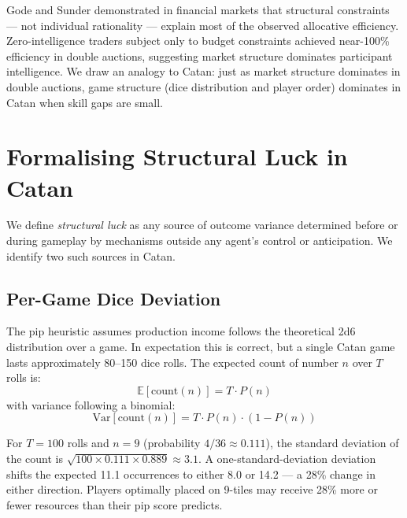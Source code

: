\documentclass[12pt,a4paper]{article}
\begin{document}
{Gode and Sunder \cite{gode1993allocative} demonstrated in financial
markets that structural constraints --- not individual rationality ---
explain most of the observed allocative efficiency. Zero-intelligence
traders subject only to budget constraints achieved near-100\% efficiency
in double auctions, suggesting market structure dominates participant
intelligence. We draw an analogy to Catan: just as market structure
dominates in double auctions, game structure (dice distribution and
player order) dominates in Catan when skill gaps are small.

\section{Formalising Structural Luck in Catan}

We define \textit{structural luck} as any source of outcome variance
determined before or during gameplay by mechanisms outside any agent's
control or anticipation. We identify two such sources in Catan.

\subsection{Per-Game Dice Deviation}

The pip heuristic assumes production income follows the theoretical 2d6
distribution over a game. In expectation this is correct, but a single
Catan game lasts approximately 80--150 dice rolls. The expected count of
number $n$ over $T$ rolls is:
\begin{equation}
  \mathbb{E}[\text{count}(n)] = T \cdot P(n)
  \label{eq:expected_count}
\end{equation}
with variance following a binomial:
\begin{equation}
  \text{Var}[\text{count}(n)] = T \cdot P(n) \cdot (1 - P(n))
  \label{eq:variance_count}
\end{equation}

For $T = 100$ rolls and $n = 9$ (probability $4/36 \approx 0.111$), the
standard deviation of the count is $\sqrt{100 \times 0.111 \times 0.889}
\approx 3.1$. A one-standard-deviation deviation shifts the expected 11.1
occurrences to either 8.0 or 14.2 --- a 28\% change in either direction.
Players optimally placed on 9-tiles may receive 28\% more or fewer
resources than their pip score predicts.

}
\end{document}
